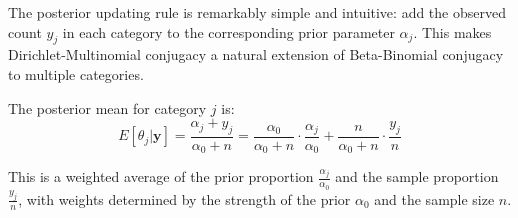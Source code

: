 \begin{examplebox}
\begin{example}
The posterior updating rule is remarkably simple and intuitive: add the observed count $y_j$ in each category to the corresponding prior parameter $\alpha_j$. This makes Dirichlet-Multinomial conjugacy a natural extension of Beta-Binomial conjugacy to multiple categories.

The posterior mean for category $j$ is:
$$E[\theta_j|\mathbf{y}] = \frac{\alpha_j + y_j}{\alpha_0 + n} = \frac{\alpha_0}{\alpha_0 + n} \cdot \frac{\alpha_j}{\alpha_0} + \frac{n}{\alpha_0 + n} \cdot \frac{y_j}{n}$$

This is a weighted average of the prior proportion $\frac{\alpha_j}{\alpha_0}$ and the sample proportion $\frac{y_j}{n}$, with weights determined by the strength of the prior $\alpha_0$ and the sample size $n$.

\end{example}
\end{examplebox}

